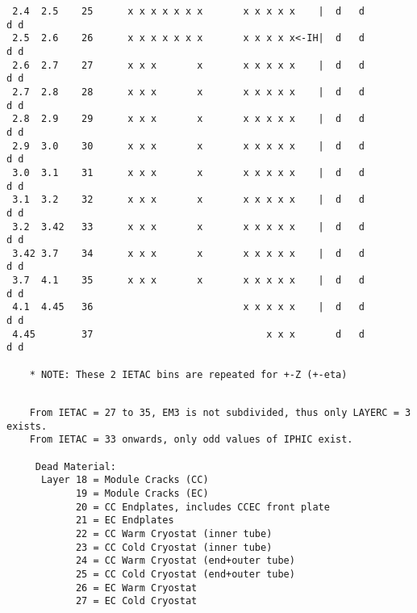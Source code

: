 \begin{verbatim}
 2.4  2.5    25      x x x x x x x       x x x x x    |  d   d         d d
 2.5  2.6    26      x x x x x x x       x x x x x<-IH|  d   d         d d
 2.6  2.7    27      x x x       x       x x x x x    |  d   d         d d
 2.7  2.8    28      x x x       x       x x x x x    |  d   d         d d
 2.8  2.9    29      x x x       x       x x x x x    |  d   d         d d
 2.9  3.0    30      x x x       x       x x x x x    |  d   d         d d
 3.0  3.1    31      x x x       x       x x x x x    |  d   d         d d
 3.1  3.2    32      x x x       x       x x x x x    |  d   d         d d
 3.2  3.42   33      x x x       x       x x x x x    |  d   d         d d
 3.42 3.7    34      x x x       x       x x x x x    |  d   d         d d
 3.7  4.1    35      x x x       x       x x x x x    |  d   d         d d
 4.1  4.45   36                          x x x x x    |  d   d         d d
 4.45        37                              x x x       d   d         d d

    * NOTE: These 2 IETAC bins are repeated for +-Z (+-eta)
\end{verbatim}
\newpage
\begin{verbatim}

    From IETAC = 27 to 35, EM3 is not subdivided, thus only LAYERC = 3 exists.
    From IETAC = 33 onwards, only odd values of IPHIC exist.

     Dead Material:
      Layer 18 = Module Cracks (CC)
            19 = Module Cracks (EC)
            20 = CC Endplates, includes CCEC front plate
            21 = EC Endplates
            22 = CC Warm Cryostat (inner tube)
            23 = CC Cold Cryostat (inner tube)
            24 = CC Warm Cryostat (end+outer tube)
            25 = CC Cold Cryostat (end+outer tube)
            26 = EC Warm Cryostat
            27 = EC Cold Cryostat
\end{verbatim}


